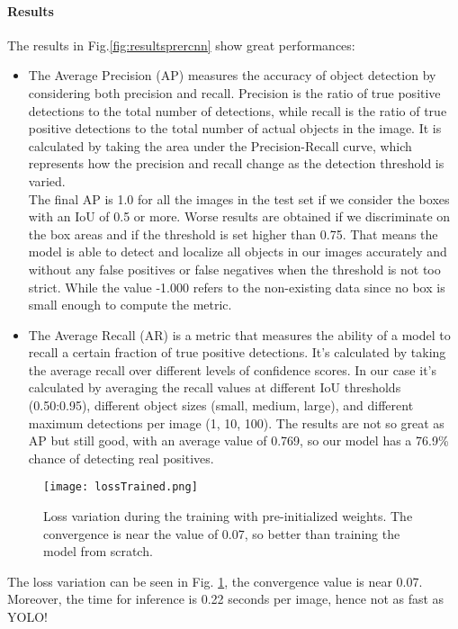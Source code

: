 \paragraph{Results}
The results in Fig.\ref{fig:resultsprercnn} show great performances:
\begin{itemize}
    \item The Average Precision (AP) measures the accuracy of object detection by considering both precision and recall. Precision is the ratio of true positive detections to the total number of detections, while recall is the ratio of true positive detections to the total number of actual objects in the image.
    It is calculated by taking the area under the Precision-Recall curve, which represents how the precision and recall change as the detection threshold is varied.\\
    The final AP is 1.0 for all the images in the test set if we consider the boxes with an IoU of 0.5 or more. Worse results are obtained if we discriminate on the box areas and if the threshold is set higher than 0.75.
    That means the model is able to detect and localize all objects in our images accurately and without any false positives or false negatives when the threshold is not too strict. While the value -1.000 refers to the non-existing data since no box is small enough to compute the metric.
    
    \item The Average Recall (AR) is a metric that measures the ability of a model to recall a certain fraction of true positive detections. It's calculated by taking the average recall over different levels of confidence scores. In our case it's calculated by averaging the recall values at different IoU thresholds (0.50:0.95), different object sizes (small, medium, large), and different maximum detections per image (1, 10, 100). The results are not so great as AP but still good, with an average value of 0.769, so our model has a 76.9\% chance of detecting real positives.
\end{itemize}

\begin{figure}[h!]
  \centering
  \texttt{[image: lossTrained.png]}
  \caption{Loss variation during the training with pre-initialized weights. The convergence is near the value of 0.07, so better than training the model from scratch.}
  \label{fig:losstrainedcnn}
\end{figure}

The loss variation can be seen in Fig. \ref{fig:losstrainedcnn}, the convergence value is near 0.07. Moreover, the time for inference is 0.22 seconds per image, hence not as fast as YOLO!

